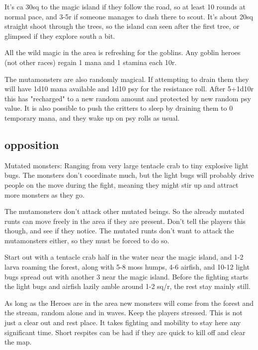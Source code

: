 It's ca 30sq to the magic island if they follow the road, so at least 10 rounds at normal pace, and 3-5r if someone manages to dash there to scout. It's about 20sq straight shoot through the trees, so the island can seen after the first tree, or glimpsed if they explore south a bit.

All the wild magic in the area is refreshing for the goblins. Any goblin heroes (not other races) regain 1 mana and 1 stamina each 10r.

The mutamonsters are also randomly magical. If attempting to drain them they will have 1d10 mana available and 1d10 psy for the resistance roll. After 5+1d10r this has "recharged" to a new random amount and protected by new random psy value. It is also possible to push the critters to sleep by draining them  to 0 temporary mana, and they wake up on psy rolls as usual.


\subsection*{opposition}

Mutated monsters: Ranging from very large tentacle crab to tiny explosive light bugs. The monsters don't coordinate much, but the light bugs will probably drive people on the move during the fight, meaning they might stir up and attract more monsters as they go.

The mutamonsters don't attack other mutated beings. So the already mutated runts can move freely in the area if they are present. Don't tell the players this though, and see if they notice. The mutated runts don't want to attack the mutamonsters either, so they must be forced to do so.

Start out with a tentacle crab half in the water near the magic island, and 1-2 larva roaming the forest, along with 5-8 moss humps, 4-6 airfish, and 10-12 light bugs spread out with another 3 near the magic island.
Before the fighting starts the light bugs and airfish lazily amble around 1-2 sq/r, the rest stay mainly still.

As long as the Heroes are in the area new monsters will come from the forest and the stream, random alone and in waves. Keep the players stressed. This is not just a clear out and rest place. It takes fighting and mobility to stay here any significant time. Short respites can be had if they are quick to kill off and clear the map.


